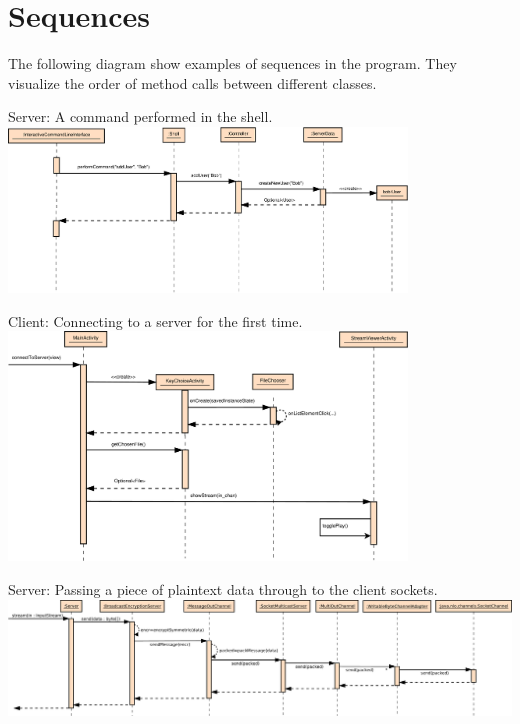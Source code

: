 \documentclass[a4paper,10pt]{scrartcl}
\begin{document}
\section{Sequences}
The following diagram show examples of sequences in the program. They visualize the order of method calls between different classes.
\begin{illustration}{Server: A command performed in the shell.}
\includegraphics [width=400px] {figures/sequence_diagram_server/Server1.pdf}
\end{illustration}
\begin{illustration}{Client: Connecting to a server for the first time.}
\includegraphics [width=400px] {figures/sequence_diagram_client/sequence_client.pdf}
\end{illustration}

\begin{landscape}
\begin{illustration}{Server: Passing a piece of plaintext data through to the client sockets.}
\includegraphics [width=700px] {figures/sequence_diagram_comm1_server/output.pdf}
\end{illustration}
\end{landscape}
\end{document}
